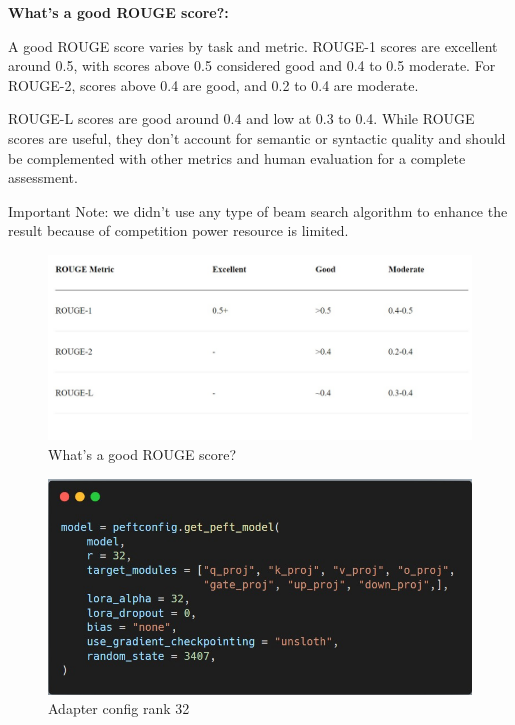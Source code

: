 \hfill \break
\textbf{What's a good ROUGE score?:}

\hfill \break
A good ROUGE score varies by task and metric. ROUGE-1 scores are excellent around 0.5, with scores above 0.5 considered good and 0.4 to 0.5 moderate. For ROUGE-2, scores above 0.4 are good, and 0.2 to 0.4 are moderate.

\hfill \break
ROUGE-L scores are good around 0.4 and low at 0.3 to 0.4. While ROUGE scores are useful, they don't account for semantic or syntactic quality and should be complemented with other metrics and human evaluation for a complete assessment.

\hfill \break

Important Note: we didn't use any type of beam search algorithm to enhance the result because of competition power resource is limited.
\begin{figure}[h!]
	\centering
	\includegraphics[scale=0.4]{figures/What's a good ROUGE score.png}
	\caption{ What's a good ROUGE score? }
\end{figure}

\newpage
\begin{figure}[h!]
	\centering
	\includegraphics[scale=0.6]{figures/Adapter config rank 32.jpeg}
	\caption{ Adapter config rank 32 }
\end{figure}




